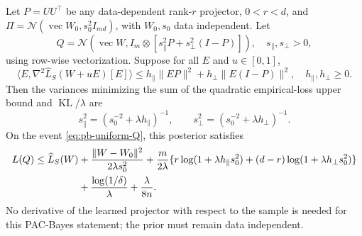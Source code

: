 \begin{proposition}
\label{prop:optimal-posterior}
Let $P=UU^\top$ be any data-dependent rank-$r$ projector, $0<r<d$, and
$\Pi=\mathcal N(\operatorname{vec}W_0,s_0^2I_{md})$, with $W_0,s_0$
data independent. Let
\begin{equation}
 Q=\mathcal N(\operatorname{vec}W,
          I_m\otimes[s_\parallel^2P+s_\perp^2(I-P)]),
 \quad s_\parallel,s_\perp>0,
\end{equation}
using row-wise vectorization. Suppose for all $E$ and $u\in[0,1]$,
\begin{equation}
 \langle E,\nabla^2\widehat L_S(W+uE)[E]\rangle
 \le h_\parallel\|EP\|^2+h_\perp\|E(I-P)\|^2,
 \quad h_\parallel,h_\perp\ge0.\label{eq:posterior-hessian}
\end{equation}
Then the variances minimizing the sum of the quadratic empirical-loss
upper bound and $\operatorname{KL}/\lambda$ are
\begin{equation}
 s_\parallel^2=(s_0^{-2}+\lambda h_\parallel)^{-1},\qquad
 s_\perp^2=(s_0^{-2}+\lambda h_\perp)^{-1}.\label{eq:optimal-variances}
\end{equation}
On the event \eqref{eq:pb-uniform-Q}, this posterior satisfies
\begin{align}
 L(Q)\le\widehat L_S(W)
 &+\frac{\|W-W_0\|^2}{2\lambda s_0^2}
 +\frac{m}{2\lambda}\{r\log(1+\lambda h_\parallel s_0^2)
                 +(d-r)\log(1+\lambda h_\perp s_0^2)\}\notag\\
 &+\frac{\log(1/\delta)}{\lambda}+\frac{\lambda}{8n}.
 \label{eq:optimized-pb}
\end{align}
No derivative of the learned projector with respect to the sample is
needed for this PAC-Bayes statement; the prior must remain data independent.
\end{proposition}
